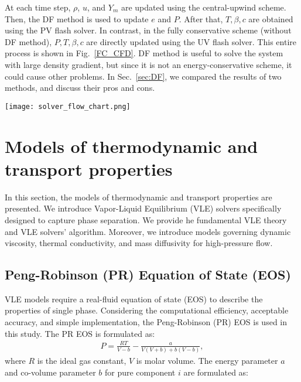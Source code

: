 At each time step, $\rho$, $u$, and $Y_m$ are updated using the central-upwind scheme. Then, the DF method is used to update $e$ and $P$. After that, $T,\beta,c$ are obtained using the PV flash solver. In contrast, in the fully conservative scheme (without DF method), $P,T,\beta,c$ are directly updated using the UV flash solver. This entire process is shown in Fig.~\ref{FC_CFD}. DF method is useful to solve the system with large density gradient, but since it is not an energy-conservative scheme, it could cause other problems. In Sec.~\ref{sec:DF}, we compared the results of two methods, and discuss their pros and cons.

\begin{figure*}[htbp]
\centering
\texttt{[image: solver\_flow\_chart.png]}
\caption{Flow chart of the VLE-based CFD framework.}
\label{FC_CFD} 
\end{figure*}



\section{Models of thermodynamic and transport properties}

In this section, the models of thermodynamic and transport properties are presented. We introduce Vapor-Liquid Equilibrium (VLE) solvers specifically designed to capture phase separation.  We provide he fundamental VLE theory and VLE solvers' algorithm. Moreover, we introduce models governing dynamic viscosity, thermal conductivity, and mass diffusivity for high-pressure flow.


\subsection{Peng-Robinson (PR) Equation of State (EOS)}
VLE models require a real-fluid equation of state (EOS) to describe the properties of single phase. Considering the computational efficiency, acceptable accuracy, and simple implementation, the Peng-Robinson (PR) EOS \cite{peng1976new} is used in this study. The PR EOS is formulated as:
\begin{align}
    P=\frac{RT}{V-b}-\frac{a}{V\left(V+b\right)+b\left(V-b\right)}, %
    \label{eq:preos}
\end{align}
where $R$ is the ideal gas constant, $V$ is molar volume. The energy parameter $a$ and co-volume parameter $b$ for pure component $i$ are formulated as:

